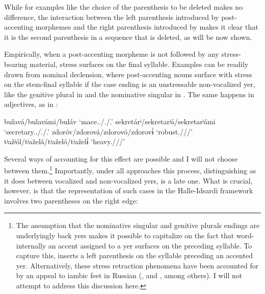 \documentclass[output=paper,colorlinks,citecolor=black,koreanfont]{langscibook}
\begin{document}
\noindent While for examples like  the choice of the parenthesis to be deleted makes no difference, the interaction between the left parenthesis introduced by post-accenting morphemes and the right parenthesis introduced by  makes it clear that it is the second parenthesis in a sequence that is deleted, as will be now shown.

Empirically, when a post-accenting morpheme is not followed by any stress-bearing material, stress surfaces on the final syllable. Examples can be readily drawn from nominal declension, where post-accenting nouns surface with stress on the stem-final syllable if the case ending is an unstressable non-vocalized yer, like the genitive plural in  and the nominative singular in . The same happens in adjectives, as in :

\ea
\ea\label{mat:ex:bulava} bulavá/bulavámi/buláv ‘mace.{\SG.\NOM/\PL.\INS/\PL.\GEN}’
\ex\label{mat:ex:sekretar} sekretárʲ/sekretarʲá/sekretarʲámi ‘secretary.{\SG.\NOM/\SG.\GEN/\PL.\INS}’
\z
\ex\label{mat:ex:adjectives}
\ea zdoróv/zdorová/zdorovó/zdorovɨ́ ‘robust.{\FEM/\MASC/\NEUT/\PL}’
\ex	tʲažʲól/tʲaželá/tʲaželó/tʲaželɨ́ ‘heavy.{\FEM/\MASC/\NEUT/\PL}’
\z 
\z

\noindent Several ways of accounting for this effect are possible and I will not choose between them.\footnote{\label{mat:fn:Yers}The assumption that the nominative singular and genitive plurals endings are underlyingly back yers makes it possible to capitalize on the fact that word-internally an accent assigned to a yer surfaces on the preceding syllable. To capture this, \citet[284]{Halle1997} inserts a left parenthesis on the syllable preceding an accented yer. Alternatively, these stress retraction phenomena have been accounted for by an appeal to iambic feet in Russian (\citealt{Crosswhite1999,mat:Crosswhite2000,Gouskova2010}, and \citealt{mat:Dubina2012}, among others). I will not attempt to address this discussion here.} Importantly, under all approaches this process, distinguishing as it does between vocalized  and non-vocalized yers, is a late one. What is crucial, however, is that the representation of such cases in the Halle-Idsardi framework involves two parentheses on the right edge:
\end{document}
